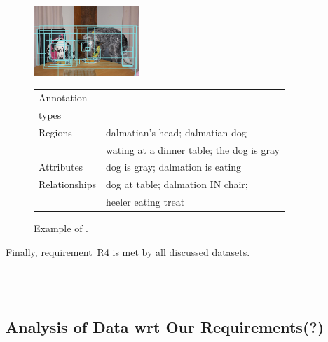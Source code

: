 {\begin{figure}[t]
	\begin{center}
	\begin{minipage}{.33\textwidth}
		\includegraphics[width=4cm]{fig/visual_genome_dogs.png}
	\end{minipage}
	\begin{minipage}{.65\textwidth}
		\begin{tabular}{l|l}
			\hline
			Annotation	& \\	
			types		& 	\\
			\hline \hline
			Regions &  dalmatian's head; dalmatian dog\\
					& wating at a dinner table; the dog is gray\\
			Attributes & dog is gray; dalmation is eating\\
			Relationships & dog at table; dalmation IN chair; \\
							& heeler eating treat \\
							\hline
		\end{tabular}
	\end{minipage}
	\caption{Example of \vgenome. \label{fig:ex_visualgenome}}
	\end{center}
\end{figure}


\noindent
Finally, requirement~R4 is met by all discussed datasets. 

\\\\

\subsection{Analysis of Data wrt Our Requirements(?)}

}
